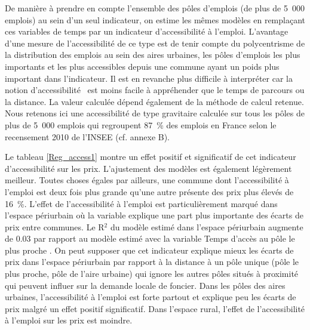 \documentclass[10.5pt,a4paper]{article}
\begin{document}
{De manière à prendre en compte l'ensemble des pôles d'emplois (de plus de 5~000 emplois) au sein d'un seul indicateur, on estime les mêmes modèles en remplaçant ces variables de temps par un indicateur d'accessibilité à l'emploi. L'avantage d'une mesure de l'accessibilité de ce type est de tenir compte du polycentrisme de la distribution des emplois au sein des aires urbaines, les pôles d'emplois les plus importants et les plus accessibles depuis une commune ayant un poids plus important dans l'indicateur. Il est en revanche plus difficile à interpréter car la notion d'\og accessibilité \fg~est moins facile à appréhender que le temps de parcours ou la distance. La valeur calculée dépend également de la méthode de calcul retenue. Nous retenons ici une accessibilité de type gravitaire calculée sur tous les pôles de plus de 5~000 emplois qui regroupent 87~\% des emplois en France selon le recensement 2010 de l'INSEE (cf. annexe B).  \par

Le tableau \ref{Reg_access1} montre un effet positif et significatif de cet indicateur d'accessibilité sur les prix. L'ajustement des modèles est également légèrement meilleur. Toutes choses égales par ailleurs, une commune dont l'accessibilité à l'emploi est deux fois plus grande qu'une autre présente des prix plus élevés de 16~\%. L'effet de l'accessibilité à l'emploi est particulièrement marqué dans l'espace périurbain où la variable explique une part plus importante des écarts de prix entre communes. Le R$^2$ du modèle estimé dans l'espace périurbain augmente de 0.03 par rapport au modèle estimé avec la variable \og Temps d’accès au pôle le plus proche \fg. On peut supposer que cet indicateur explique mieux les écarts de prix dans l'espace périurbain par rapport à la distance à un pôle unique (pôle le plus proche, pôle de l'aire urbaine) qui ignore les autres pôles situés à proximité qui peuvent influer sur la demande locale de foncier. Dans les pôles des aires urbaines, l'accessibilité à l'emploi est forte partout et explique peu les écarts de prix malgré un effet positif significatif. Dans l'espace rural, l'effet de l'accessibilité à l'emploi sur les prix est moindre. \par

}
\end{document}
